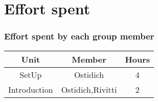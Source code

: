 \chapter{Effort spent}
\subsection{Effort spent by each group member}

\begin{table}[h]
    \centering
    \begin{tabular}{|c|c|c|}
        \hline \textbf{Unit} & \textbf{Member} & \textbf{Hours} \\ 
        \hline SetUp & Ostidich & 4 \\
        \hline Introduction & Ostidich,Rivitti & 2 \\
        \hline
    \end{tabular}\label{tab:effort-table}
\end{table}

    